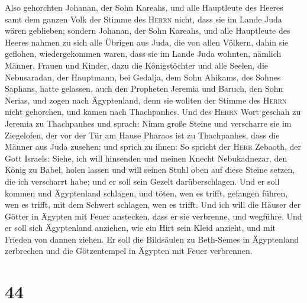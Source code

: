  Also gehorchten Johanan, der Sohn Kareahs, und alle
Hauptleute des Heeres samt dem ganzen Volk der Stimme des \textsc{Herrn}
nicht, dass sie im Lande Juda wären geblieben;  sondern
Johanan, der Sohn Kareahs, und alle Hauptleute des Heeres nahmen zu sich
alle Übrigen aus Juda, die von allen Völkern, dahin sie geflohen,
wiedergekommen waren, dass sie im Lande Juda wohnten, 
nämlich Männer, Frauen und Kinder, dazu die Königstöchter und alle
Seelen, die Nebusaradan, der Hauptmann, bei Gedalja, dem Sohn Ahikams,
des Sohnes Saphans, hatte gelassen, auch den Propheten Jeremia und
Baruch, den Sohn Nerias,  und zogen nach Ägyptenland, denn
sie wollten der Stimme des \textsc{Herrn} nicht gehorchen, und kamen
nach Thachpanhes.  Und des \textsc{Herrn} Wort geschah zu
Jeremia zu Thachpanhes und sprach:  Nimm große Steine und
verscharre sie im Ziegelofen, der vor der Tür am Hause Pharaos ist zu
Thachpanhes, dass die Männer aus Juda zusehen;  und
sprich zu ihnen: So spricht der \textsc{Herr} Zebaoth, der Gott Israels:
Siehe, ich will hinsenden und meinen Knecht Nebukadnezar, den König zu
Babel, holen lassen und will seinen Stuhl oben auf diese Steine setzen,
die ich verscharrt habe; und er soll sein Gezelt darüberschlagen.
 Und er soll kommen und Ägyptenland schlagen, und töten,
wen es trifft, gefangen führen, wen es trifft, mit dem Schwert schlagen,
wen es trifft.  Und ich will die Häuser der Götter in
Ägypten mit Feuer anstecken, dass er sie verbrenne, und wegführe. Und er
soll sich Ägyptenland anziehen, wie ein Hirt sein Kleid anzieht, und mit
Frieden von dannen ziehen.  Er soll die Bildsäulen zu
Beth-Semes in Ägyptenland zerbrechen und die Götzentempel in Ägypten mit
Feuer verbrennen.

\hypertarget{section-43}{%
\section{44}\label{section-43}}

